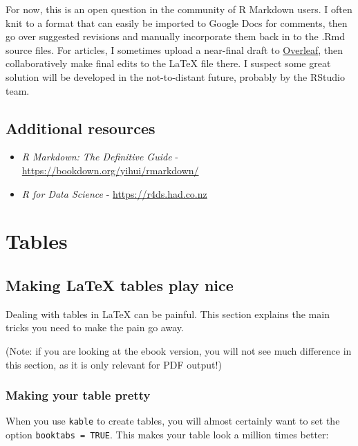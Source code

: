 \documentclass[a4paper, twoside]{templates/ociamthesis}
\begin{document}
For now, this is an open question in the community of R Markdown users.
I often knit to a format that can easily be imported to Google Docs for comments, then go over suggested revisions and manually incorporate them back in to the .Rmd source files.
For articles, I sometimes upload a near-final draft to \href{https://www.overleaf.com/}{Overleaf}, then collaboratively make final edits to the LaTeX file there.
I suspect some great solution will be developed in the not-to-distant future, probably by the RStudio team.

\hypertarget{additional-resources}{%
\section{Additional resources}\label{additional-resources}}

\begin{itemize}
\item
  \emph{R Markdown: The Definitive Guide} - \url{https://bookdown.org/yihui/rmarkdown/}
\item
  \emph{R for Data Science} - \url{https://r4ds.had.co.nz}
\end{itemize}

\hypertarget{tables}{%
\chapter{Tables}\label{tables}}

\minitoc 

\hypertarget{making-latex-tables-play-nice}{%
\section{Making LaTeX tables play nice}\label{making-latex-tables-play-nice}}

Dealing with tables in LaTeX can be painful.
This section explains the main tricks you need to make the pain go away.

(Note: if you are looking at the ebook version, you will not see much difference in this section, as it is only relevant for PDF output!)

\hypertarget{making-your-table-pretty}{%
\subsection{Making your table pretty}\label{making-your-table-pretty}}

When you use \texttt{kable} to create tables, you will almost certainly want to set the option \texttt{booktabs\ =\ TRUE}.
This makes your table look a million times better:
\end{document}
